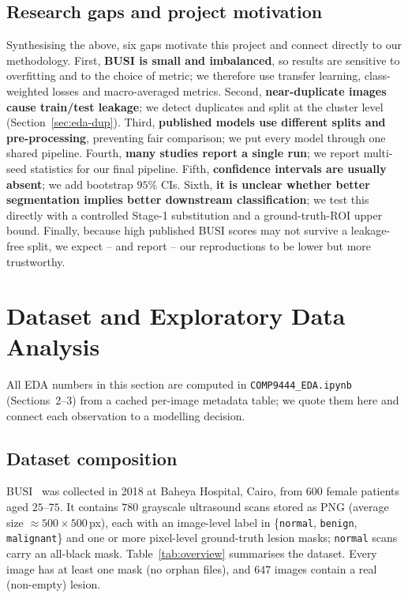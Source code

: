 \documentclass[11pt]{article}
\begin{document}
\subsection{Research gaps and project motivation}
\label{sec:gaps}
Synthesising the above, six gaps motivate this project and connect directly to
our methodology. First, \textbf{BUSI is small and imbalanced}, so results are
sensitive to overfitting and to the choice of metric; we therefore use transfer
learning, class-weighted losses and macro-averaged metrics. Second,
\textbf{near-duplicate images cause train/test leakage}; we detect duplicates and
split at the cluster level (Section~\ref{sec:eda-dup}). Third, \textbf{published
models use different splits and pre-processing}, preventing fair comparison; we
put every model through one shared pipeline. Fourth, \textbf{many studies report
a single run}; we report multi-seed statistics for our final pipeline. Fifth,
\textbf{confidence intervals are usually absent}; we add bootstrap $95\%$ CIs.
Sixth, \textbf{it is unclear whether better segmentation implies better
downstream classification}; we test this directly with a controlled Stage-1
substitution and a ground-truth-ROI upper bound. Finally, because high published
BUSI scores may not survive a leakage-free split, we expect -- and report -- our
reproductions to be lower but more trustworthy.

\section{Dataset and Exploratory Data Analysis}
\label{sec:eda}
All EDA numbers in this section are computed in \texttt{COMP9444\_EDA.ipynb}
(Sections~2--3) from a cached per-image metadata table; we quote them here and
connect each observation to a modelling decision.

\subsection{Dataset composition}
\label{sec:eda-comp}
BUSI~\cite{aldhabyani2020busi} was collected in 2018 at Baheya Hospital, Cairo,
from $600$ female patients aged $25$--$75$. It contains $780$ grayscale
ultrasound scans stored as PNG (average size $\approx 500\times500$\,px), each
with an image-level label in \{\texttt{normal}, \texttt{benign},
\texttt{malignant}\} and one or more pixel-level ground-truth lesion masks;
\texttt{normal} scans carry an all-black mask. Table~\ref{tab:overview}
summarises the dataset. Every image has at least one mask (no orphan files), and
$647$ images contain a real (non-empty) lesion.
\end{document}
